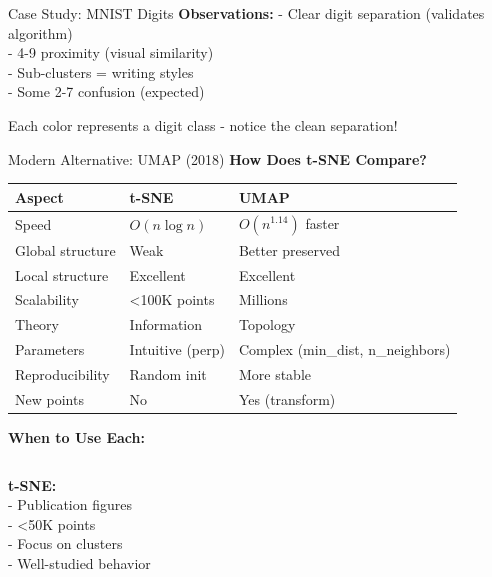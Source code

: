 \documentclass[10pt]{beamer}
\newcommand{\emphtext}[1]{\textcolor{upcblue}{\textbf{#1}}}
\newcommand{\conceptbox}[1]{\colorbox{upcblue!10}{\begin{minipage}{0.85\textwidth}\centering #1\end{minipage}}}
\begin{document}
\begin{frame}{Case Study: MNIST Digits}
\vspace{0.3cm}
\textbf{Observations:}
\footnotesize
- Clear digit separation (validates algorithm)\\
- 4-9 proximity (visual similarity)\\
- Sub-clusters = writing styles\\
- Some 2-7 confusion (expected)

\begin{center}
\conceptbox{\footnotesize Each color represents a digit class - notice the clean separation!}
\end{center}
\end{frame}

\begin{frame}{Modern Alternative: UMAP (2018)}
\emphtext{How Does t-SNE Compare?}

\vspace{0.3cm}
\begin{center}
\small
\begin{tabular}{lll}
\toprule
\textbf{Aspect} & \textbf{t-SNE} & \textbf{UMAP} \\
\midrule
Speed & $O(n\log n)$ & $O(n^{1.14})$ faster \\
Global structure & Weak & Better preserved \\
Local structure & Excellent & Excellent \\
Scalability & <100K points & Millions \\
Theory & Information & Topology \\
Parameters & Intuitive (perp) & Complex (min\_dist, n\_neighbors) \\
Reproducibility & Random init & More stable \\
New points & No & Yes (transform) \\
\bottomrule
\end{tabular}
\end{center}

\vspace{0.3cm}
\textbf{When to Use Each:}

\begin{columns}[T]
\begin{column}{0.48\textwidth}
\footnotesize
\textbf{t-SNE:}\\
- Publication figures\\
- <50K points\\
- Focus on clusters\\
- Well-studied behavior
\end{column}


\end{columns}
\end{frame}
\end{document}
